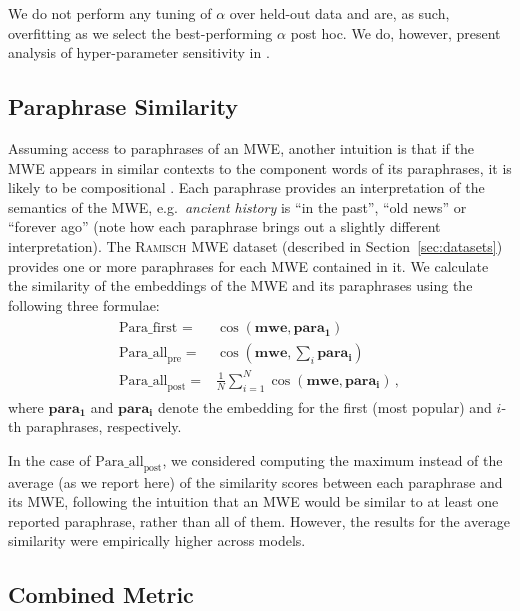 \documentclass[11pt,a4paper]{article}
\newcommand{\lex}[1]{\textit{#1}\xspace}
\newcommand{\gloss}[1]{``#1''\xspace}
\newcommand{\dataset}[2][]{\textsc{#2}$_{\text{#1}}$\xspace}
\newcommand{\ramisch}{\dataset{Ramisch}}
\newcommand{\method}[2][]{\ensuremath{\text{#2}_{\text{#1}}}\xspace}
\newcommand{\firstpara}{\method{Para\_first}}
\newcommand{\avgparapre}{\method[pre]{Para\_all}}
\newcommand{\avgparapost}{\method[post]{Para\_all}}
\newcommand{\MWEvec}{\ensuremath{\mathbf{mwe}}\xspace}
\newcommand{\paravec}[1][]{\ensuremath{\mathbf{para_{#1}}}\xspace}
\newcommand{\secref}[2][]{Section#1~\ref{#2}\xspace}
\begin{document}
We do not perform any tuning of $\alpha$ over held-out data and are, as
such, overfitting as we select the best-performing $\alpha$ post
hoc. We do, however, present analysis of hyper-parameter sensitivity in .

\subsection{Paraphrase Similarity}
\label{sec:paraphrase}

Assuming access to paraphrases of an MWE, another intuition is that if the MWE appears in similar contexts to the component words of its paraphrases, it is likely to be compositional \cite{Shwartz2018}. Each paraphrase provides an interpretation of the semantics of the MWE, e.g.\ \lex{ancient history} is \gloss{in the past}, \gloss{old news} or \gloss{forever ago} (note how each paraphrase brings out a slightly different interpretation). The \ramisch MWE dataset (described in \secref{sec:datasets}) provides one or more paraphrases for each MWE contained in it. We calculate the similarity of the embeddings of the MWE and its paraphrases using the following three formulae:
\begin{eqnarray*}
  \begin{split}
\firstpara = & \cos(\MWEvec, \paravec[1])\\
\avgparapre = & \cos(\MWEvec, \sum_i \paravec[i])\\
\avgparapost = & \frac{1}{N} \sum_{i=1}^N \cos(\MWEvec, \paravec[i])\,,
  \end{split}
\end{eqnarray*}
where \paravec[1] and \paravec[i] denote the embedding for the first (most popular) and $i$-th paraphrases, respectively.

In the case of \avgparapost, we considered computing the maximum instead of the average (as we report here) of the similarity scores between each paraphrase and its MWE, following the intuition that an MWE would be similar to at least one reported paraphrase, rather than all of them. However, the results for the average similarity were empirically higher across models.

\subsection{Combined Metric}
\label{sec:combined}
\end{document}
